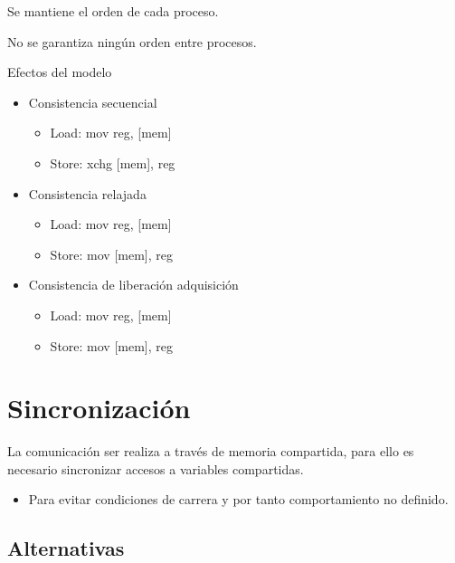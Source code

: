 \documentclass[12pt, twoside, openright]{report} %
\begin{document}
Se mantiene el orden de cada proceso.

No se garantiza ningún orden entre procesos.

Efectos del modelo
\begin{itemize}
	\item Consistencia secuencial

	      \begin{itemize}
		      \item Load: mov reg, {[}mem{]}
		      \item Store: xchg {[}mem{]}, reg
	      \end{itemize}
	      \pagebreak
	\item Consistencia relajada
	      \begin{itemize}
		      \item Load: mov reg, {[}mem{]}

		      \item Store: mov {[}mem{]}, reg

	      \end{itemize}

	\item Consistencia de liberación adquisición

	      \begin{itemize}
		      \item Load: mov reg, {[}mem{]}
		      \item Store: mov {[}mem{]}, reg
	      \end{itemize}
\end{itemize}



\section{Sincronización}


La comunicación ser realiza a través de memoria compartida, para
ello es necesario sincronizar accesos a variables compartidas.

\begin{itemize}

	\item Para evitar condiciones de carrera y por tanto comportamiento no
	      definido.
\end{itemize}

\subsection{Alternativas}
\end{document}
